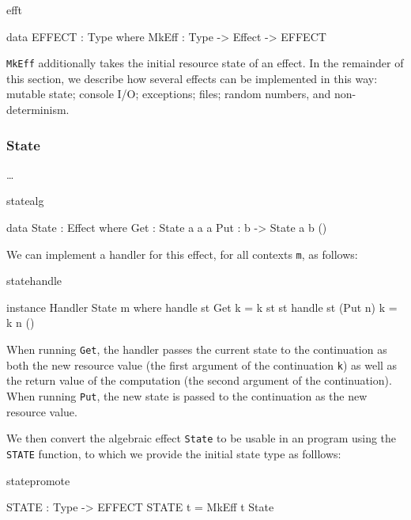 \begin{SaveVerbatim}{efft}

data EFFECT : Type where
     MkEff : Type -> Effect -> EFFECT

\end{SaveVerbatim}

\noindent
\texttt{MkEff} additionally takes the initial resource state of an effect.
In the remainder of this section, we describe how several effects can be
implemented in this way: mutable state; console I/O; exceptions; files; random
numbers, and non-determinism.

\subsubsection{State}

\ldots

\begin{SaveVerbatim}{statealg}

data State : Effect where
     Get :      State a a a
     Put : b -> State a b ()

\end{SaveVerbatim}

We can implement a handler for this effect, for all contexts \texttt{m},
as follows:

\begin{SaveVerbatim}{statehandle}

instance Handler State m where
     handle st Get     k = k st st
     handle st (Put n) k = k n ()

\end{SaveVerbatim}

\noindent
When running \texttt{Get}, the handler passes the current state to the
continuation as both the new resource value (the first argument of the
continuation \texttt{k}) as well as the return value of the computation (the
second argument of the continuation). When running \texttt{Put}, the new state
is passed to the continuation as the new resource value.

We then convert the algebraic effect \texttt{State} to be usable in an
\Eff{} program using the \texttt{STATE} function, to which we provide the
initial state type as folllows:

\begin{SaveVerbatim}{statepromote}

STATE : Type -> EFFECT
STATE t = MkEff t State

\end{SaveVerbatim}

